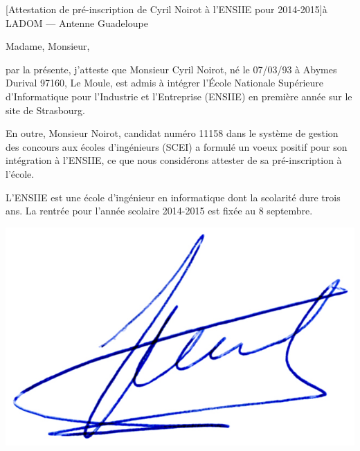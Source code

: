\documentclass[a4paper,10pt]{article}
\begin{document}

\begin{letter}[Attestation de pré-inscription de Cyril Noirot à l'ENSIIE pour 2014-2015]{à}%
{LADOM --- Antenne Guadeloupe}


Madame, Monsieur,


\vspace{1cm}
par la présente, j'atteste que Monsieur Cyril Noirot, né le 07/03/93 à Abymes
Durival 97160, Le Moule, 
est admis à intégrer l'École Nationale Supérieure d'Informatique pour
l'Industrie et l'Entreprise (ENSIIE) en première année sur le site de Strasbourg. 

En outre, Monsieur Noirot, candidat numéro 11158 dans le système de gestion des concours
aux écoles d'ingénieurs (SCEI) a formulé un voeux positif pour son intégration
à l'ENSIIE, ce que nous considérons attester de sa pré-inscription à l'école.


\vspace{1cm}
L'ENSIIE est une école d'ingénieur en informatique dont la scolarité dure trois
ans. La rentrée pour l'année scolaire 2014-2015 est fixée au 8 septembre.
 
\hfill


\end{letter}
\begin{flushright}
\includegraphics[width=.2\textwidth]{signgenaud.jpg}
\end{flushright}
\end{document}
